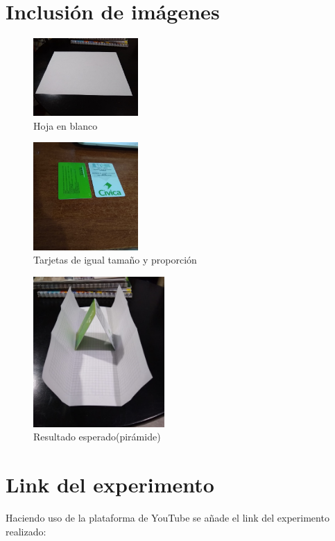 \documentclass{article}
\begin{document}
\section{Inclusión de imágenes} \label{imagenes}
\begin{figure}[h]
\includegraphics[width=4cm]{Hoja.jpeg}
\centering
\caption{Hoja en blanco}
\label{fig:Hoja}
\end{figure}
\begin{figure}[h]
\includegraphics[width=4cm]{Tarjetas.jpeg}
\centering
\caption{Tarjetas de igual tamaño y proporción}
\label{fig:Tarjetas}
\end{figure}
\begin{figure}[h]
\includegraphics[width=5cm]{Piramide.jpeg}
\centering
\caption{Resultado esperado(pirámide)}
\label{fig:Piramide}
\end{figure}

\section{Link del experimento}
Haciendo uso de la plataforma de YouTube se añade el link del experimento realizado:
\end{document}

